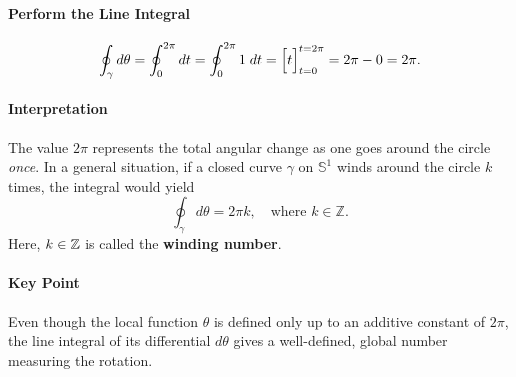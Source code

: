 \documentclass[11pt,openany]{article}
\begin{document}
\paragraph{Perform the Line Integral}\[
\oint_{\gamma}d\theta=\oint_0^{2\pi} dt = \oint_0^{2\pi} 1\;dt = \Bigl[t\Bigr]_{t=0}^{t=2\pi} = 2\pi - 0 = 2\pi.
\]

\paragraph{Interpretation}
The value \(2\pi\) represents the total angular change as one goes around the circle \emph{once}.
In a general situation, if a closed curve \(\gamma\) on \(\mathbb{S}^1\) winds around the circle \(k\) times, the integral would yield \[
\oint_\gamma d\theta = 2\pi k,\quad\text{where $k\in\mathbb{Z}$.}
\] Here, $k\in\mathbb{Z}$ is called the \textbf{winding number}.

\paragraph{Key Point}
Even though the local function $\theta$ is defined only up to an additive constant of $2\pi$, the line integral of its differential $d\theta$ gives a well-defined, global number measuring the rotation.
\end{document}

